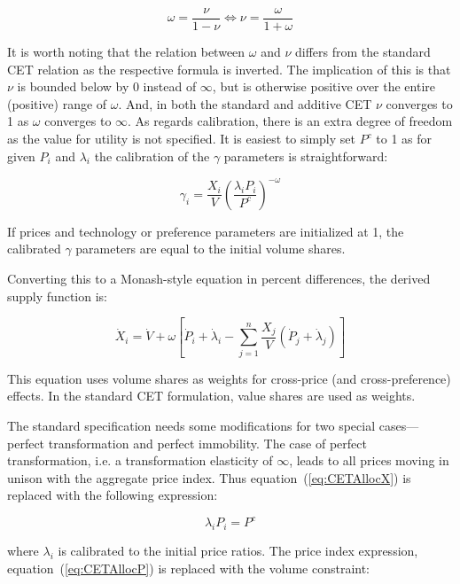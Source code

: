 \begin{displaymath}
\omega=\frac{\nu}{1-\nu} \iff \nu = \frac{\omega}{1+\omega}
\end{displaymath}

\noindent It is worth noting that the relation between $\omega$ and $\nu$ differs from the standard CET
relation as the respective formula is inverted. The implication of this is that $\nu$ is bounded below
by 0 instead of $\infty$, but is otherwise positive over the entire (positive) range of $\omega$. And,
in both the standard and additive CET $\nu$ converges to 1 as $\omega$ converges to $\infty$.
As regards calibration, there is an extra degree of freedom as the value for utility is not
specified. It is easiest to simply set $P^c$ to 1 as for given $P_i$ and $\lambda_i$ the calibration of
the $\gamma$ parameters is straightforward:

\begin{displaymath}
\gamma_i = \frac{X_i}{V} {\left( \frac {\lambda_i P_i}{P^c} \right)}^{-\omega}
\end{displaymath}

\noindent If prices and technology or preference parameters are initialized at 1, the calibrated $\gamma$ parameters are equal to the initial volume shares.

Converting this to a Monash-style equation in percent differences, the derived supply function is:

\begin{displaymath}
{\dot X}_i = {\dot V} + \omega \left[ {\dot P}_i + {\dot \lambda}_i
- \sum\limits_{j = 1}^n {\frac{X_j}{V}
\left( {\dot P}_j + {\dot \lambda}_j \right) } \right]
\end{displaymath}

\noindent This equation uses volume shares as weights for cross-price (and cross-preference) effects.
In the standard CET formulation, value shares are used as weights.

The standard specification needs some modifications for two special cases---perfect transformation
and perfect immobility. The case of perfect transformation, i.e. a transformation elasticity of $\infty$,
leads to all prices moving in unison with the aggregate price index. Thus equation~(\ref{eq:CETAllocX})
is replaced with the following expression:

\[
\lambda_i P_i = {P^c}
\]

\noindent where $\lambda_i$ is calibrated to the initial price ratios. The price index expression,
equation~(\ref{eq:CETAllocP}) is replaced with the volume constraint:

